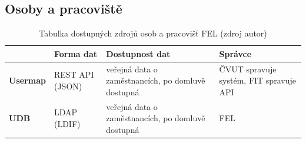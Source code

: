 \subsection{Osoby a pracoviště}
\begin{table}[H]
\begin{ctucolortab}
\begin{tabularx}{0.95\linewidth}{l|X|X|X}
\bfseries  & \bfseries Forma dat & \bfseries Dostupnost dat  & \bfseries Správce\\\hline 
    \textbf{Usermap} & REST API (JSON) & veřejná data o zaměstnancích, po domluvě dostupná & ČVUT spravuje systém, FIT spravuje API \\\hline
    \textbf{UDB} & LDAP (LDIF) & veřejná data o zaměstnancích, po domluvě dostupná & FEL \\
\end{tabularx}
\end{ctucolortab}
	\caption{Tabulka dostupných zdrojů osob a pracovišť FEL (zdroj autor)}
	\label{tab:data-sources-people-fel}
\end{table}

